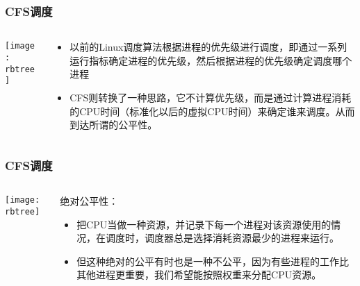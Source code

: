 \begin{frame}
	\frametitle{CFS调度}
	\begin{columns}
	\begin{column}{.4\textwidth}
	\Large \centering
	
    \texttt{[image: rbtree]}
	
	\end{column}
	
	\begin{column}{.6\textwidth}
\begin{itemize}
	\item 以前的Linux调度算法根据进程的优先级进行调度，即通过一系列运行指标确定进程的优先级，然后根据进程的优先级确定调度哪个进程
	\item CFS则转换了一种思路，它不计算优先级，而是通过计算进程消耗的CPU时间（标准化以后的虚拟CPU时间）来确定谁来调度。从而到达所谓的公平性。

	\end{itemize}

	\end{column}
\end{columns}
\end{frame}


\begin{frame}
	\frametitle{CFS调度}
	\begin{columns}
		\begin{column}{.4\textwidth}
			\Large \centering
			
			\texttt{[image: rbtree]}
			
		\end{column}
		
		\begin{column}{.6\textwidth}
			绝对公平性：
			\begin{itemize}
				\item 把CPU当做一种资源，并记录下每一个进程对该资源使用的情况，在调度时，调度器总是选择消耗资源最少的进程来运行。
				\item 但这种绝对的公平有时也是一种不公平，因为有些进程的工作比其他进程更重要，我们希望能按照权重来分配CPU资源。
				
			\end{itemize}
			
		\end{column}
	\end{columns}
\end{frame}


